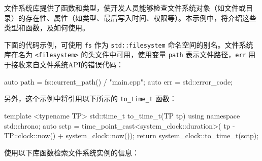 文件系统库提供了函数和类型，使开发人员能够检查文件系统对象（如文件或目录）的存在性、属性（如类型、最后写入时间、权限等）。本示例中，将介绍这些类型和函数，及如何使用。


下面的代码示例，可使用 \verb|fs| 作为 \verb|std::filesystem| 命名空间的别名。文件系统库在名为 \verb|<filesystem>| 的头文件中可用，使用变量 \verb|path| 表示文件路径，\verb|err| 用于接收来自文件系统API的错误代码：

\begin{cpp}
auto path = fs::current_path() / "main.cpp";
auto err = std::error_code{};
\end{cpp}

另外，这个示例中将引用以下所示的 \verb|to_time_t| 函数：

\begin{cpp}
template <typename TP>
std::time_t to_time_t(TP tp)
{
    using namespace std::chrono;
    auto sctp = time_point_cast<system_clock::duration>(
        tp - TP::clock::now() + system_clock::now());
    return system_clock::to_time_t(sctp);
}
\end{cpp}


使用以下库函数检索文件系统实例的信息：

